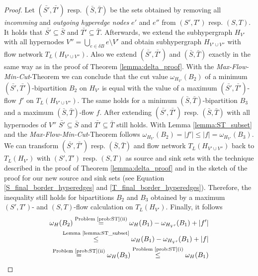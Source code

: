 \begin{proof}
Let $(\bar{S'},\bar{T'})$ resp. $(\bar{S},\bar{T})$ be the sets obtained by removing all
\emph{incomming} and \emph{outgoing hyperedge nodes} $e'$ and $e''$ from $(S',T')$ resp.
$(S,T)$. It holds that $\bar{S'} \subseteq \bar{S}$ and $\bar{T'} \subseteq \bar{T}$. Afterwards,
we extend the subhypergraph $H_{V'}$ with all hypernodes $V'' = \bigcup_{e \in \delta B} e \setminus V'$
and obtain subhypergraph $H_{V' \cup V''}$ with flow network $T_L(H_{V' \cup V''})$.
Also we extend $(\bar{S'},\bar{T'})$ and $(\bar{S},\bar{T})$ exactly in the same way as 
in the proof of Theorem \ref{lemma:delta_proof}. With the \emph{Max-Flow-Min-Cut}-Theorem 
\cite{ford1956maximal} we can conclude that the cut value $\omega_{H_{V'}}(B_2)$ of 
a minimum $(\bar{S'},\bar{T'})$-bipartition $B_2$ on $H_{V'}$ is equal with the value of a 
maximum $(\bar{S'},\bar{T'})$-flow $f'$ on $T_L(H_{V' \cup V''})$. 
The same holds for a minimum $(\bar{S},\bar{T})$-bipartition
$B_3$ and a maximum $(\bar{S},\bar{T})$-flow $f$. After extending $(\bar{S'},\bar{T'})$ 
resp. $(\bar{S},\bar{T})$ with all hypernodes of $V''$ $\bar{S'} \subseteq \bar{S}$
and $\bar{T'} \subseteq \bar{T}$ still holds. With Lemma \ref{lemma:ST_subset} and the 
\emph{Max-Flow-Min-Cut}-Theorem follows $\omega_{H_{V'}}(B_2) = |f'| \le |f| = \omega_{H_{V'}}(B_3)$.\\
We can transform $(\bar{S'},\bar{T'})$ resp. $(\bar{S},\bar{T})$ and flow network $T_L(H_{V'\cup V''})$
back to $T_L(H_{V'})$ with $(S',T')$ resp. $(S,T)$ as source and sink sets
with the technique described in the proof of Theorem \ref{lemma:delta_proof} and in the sketch
of the proof for our new source and sink sets (see Equation \ref{S_final_border_hyperedges} and
\ref{T_final_border_hyperedges}). Therefore, the inequality still holds for bipartitions
$B_2$ and $B_3$ obtained by a maximum $(S',T')$- and $(S,T)$-flow calculation on $T_L(H_{V'})$.
Finally, it follows
\begin{align*}
\omega_H(B_2) \stackrel{\text{Problem \ref{prob:ST}(ii)}}{=} 
\omega_H(B_1) - \omega_{H_{V'}}(B_1) + |f'| \\
\stackrel{\text{Lemma \ref{lemma:ST_subset}}}{\le} \omega_H(B_1) - \omega_{H_{V'}}(B_1) + |f| \\
\stackrel{\text{Problem \ref{prob:ST}(ii)}}{=} \omega_H(B_3) \stackrel{\text{Problem \ref{prob:ST}(i)}}{\le} \omega_H(B_1)
\end{align*}
\end{proof}

